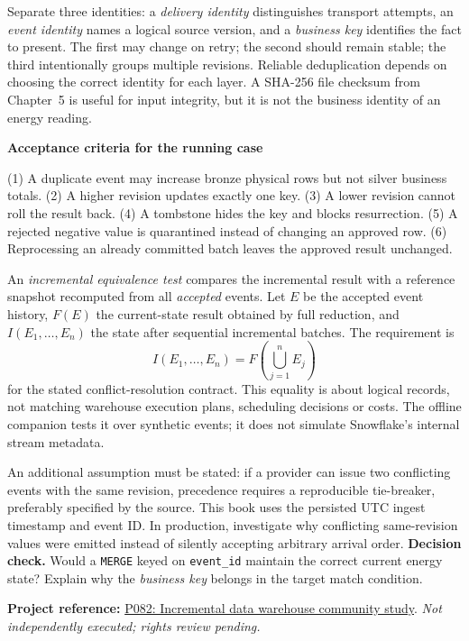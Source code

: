 \documentclass[11pt,twoside]{article}
\newcommand{\repo}[2]{\par\begingroup\fontsize{8.0}{9.6}\selectfont\sffamily\color{inkgray}\textbf{Project reference:} \href{#2}{#1}. \textit{Not independently executed; rights review pending.}\par\endgroup}
\begin{document}
Separate three identities: a \emph{delivery identity} distinguishes transport attempts, an \emph{event identity} names a logical source version, and a \emph{business key} identifies the fact to present. The first may change on retry; the second should remain stable; the third intentionally groups multiple revisions. Reliable deduplication depends on choosing the correct identity for each layer. A SHA-256 file checksum from Chapter~5 is useful for input integrity, but it is not the business identity of an energy reading.
\begin{whitebox}\textbf{Acceptance criteria for the running case}\par
(1) A duplicate event may increase bronze physical rows but not silver business totals. (2) A higher revision updates exactly one key. (3) A lower revision cannot roll the result back. (4) A tombstone hides the key and blocks resurrection. (5) A rejected negative value is quarantined instead of changing an approved row. (6) Reprocessing an already committed batch leaves the approved result unchanged.\end{whitebox}
An \emph{incremental equivalence test} compares the incremental result with a reference snapshot recomputed from all \emph{accepted} events. Let \(E\) be the accepted event history, \(F(E)\) the current-state result obtained by full reduction, and \(I(E_1,\ldots,E_n)\) the state after sequential incremental batches. The requirement is
\[
  I(E_1,\ldots,E_n)=F\left(\bigcup_{j=1}^{n}E_j\right)
\]
for the stated conflict-resolution contract. This equality is about logical records, not matching warehouse execution plans, scheduling decisions or costs. The offline companion tests it over synthetic events; it does not simulate Snowflake's internal stream metadata.

An additional assumption must be stated: if a provider can issue two conflicting events with the same revision, precedence requires a reproducible tie-breaker, preferably specified by the source. This book uses the persisted UTC ingest timestamp and event ID. In production, investigate why conflicting same-revision values were emitted instead of silently accepting arbitrary arrival order.
\textbf{Decision check.} Would a \texttt{MERGE} keyed on \texttt{event\_id} maintain the correct current energy state? Explain why the \emph{business key} belongs in the target match condition.
\repo{P082: Incremental data warehouse community study}{https://github.com/kovinaveenkumar/snowflake-incremental-dw}
\newpage
\end{document}
